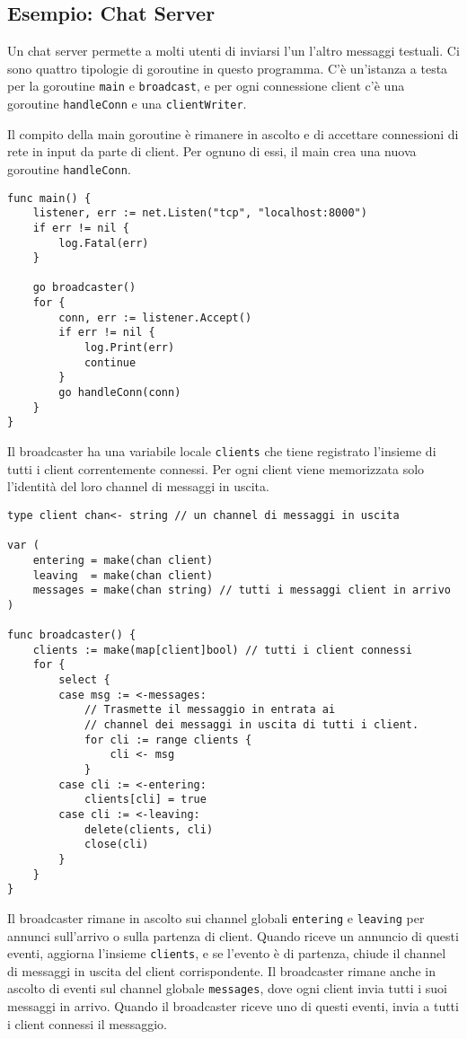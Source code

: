 \documentclass[../../thesis.tex]{subfiles}
\begin{document}
    \subsection{Esempio: Chat Server}\label{subsec:esempio:-chat-server}
    Un chat server permette a molti utenti di inviarsi l'un l'altro messaggi testuali.
    Ci sono quattro tipologie di goroutine in questo programma.
    C'è un'istanza a testa per la goroutine \verb"main" e \verb"broadcast", e per ogni connessione client c'è una goroutine \verb"handleConn" e una \verb"clientWriter".
    \hfill \vspace{12pt}

    Il compito della main goroutine è rimanere in ascolto e di accettare connessioni di rete in input da parte di client.
    Per ognuno di essi, il main crea una nuova goroutine \verb"handleConn".
    \begin{lstlisting}[frame = single,label={lst:lstlisting7-10.1}]
func main() {
    listener, err := net.Listen("tcp", "localhost:8000")
    if err != nil {
        log.Fatal(err)
    }

    go broadcaster()
    for {
        conn, err := listener.Accept()
        if err != nil {
            log.Print(err)
            continue
        }
        go handleConn(conn)
    }
}
    \end{lstlisting}
    Il broadcaster ha una variabile locale \verb"clients" che tiene registrato l'insieme di tutti i client correntemente connessi.
    Per ogni client viene memorizzata solo l'identità del loro channel di messaggi in uscita.
    \begin{lstlisting}[frame = single,label={lst:lstlisting7-10.2}]
type client chan<- string // un channel di messaggi in uscita

var (
    entering = make(chan client)
    leaving  = make(chan client)
    messages = make(chan string) // tutti i messaggi client in arrivo
)

func broadcaster() {
    clients := make(map[client]bool) // tutti i client connessi
    for {
        select {
        case msg := <-messages:
            // Trasmette il messaggio in entrata ai
            // channel dei messaggi in uscita di tutti i client.
            for cli := range clients {
                cli <- msg
            }
        case cli := <-entering:
            clients[cli] = true
        case cli := <-leaving:
            delete(clients, cli)
            close(cli)
        }
    }
}
    \end{lstlisting}
    Il broadcaster rimane in ascolto sui channel globali \verb"entering" e \verb"leaving" per annunci sull'arrivo o sulla partenza di client.
    Quando riceve un annuncio di questi eventi, aggiorna l'insieme \verb"clients", e se l'evento è di partenza, chiude il channel di messaggi in uscita del client corrispondente.
    Il broadcaster rimane anche in ascolto di eventi sul channel globale \verb"messages", dove ogni client invia tutti i suoi messaggi in arrivo.
    Quando il broadcaster riceve uno di questi eventi, invia a tutti i client connessi il messaggio.
    \hfill \vspace{12pt}
\end{document}
